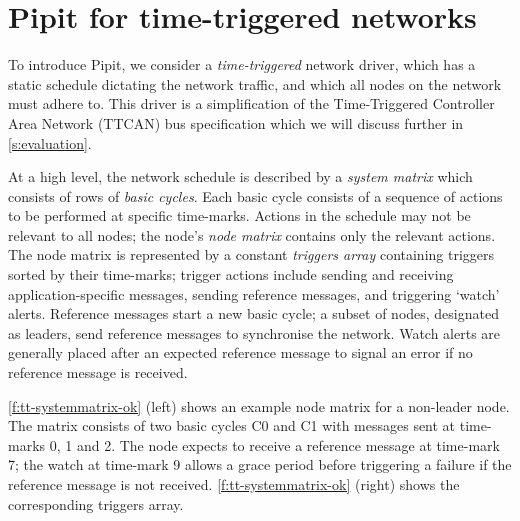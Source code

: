 
\section{Pipit for time-triggered networks}
\label{s:motivation}

To introduce Pipit, we consider a \emph{time-triggered} network driver, which has a static schedule dictating the network traffic, and which all nodes on the network must adhere to.
This driver is a simplification of the Time-Triggered Controller Area Network (TTCAN) bus specification \cite{fuehrer2001time} which we will discuss further in \autoref{s:evaluation}.

At a high level, the network schedule is described by a \emph{system matrix} which consists of rows of \emph{basic cycles}.
Each basic cycle consists of a sequence of actions to be performed at specific time-marks.
Actions in the schedule may not be relevant to all nodes; the node's \emph{node matrix} contains only the relevant actions.
The node matrix is represented by a constant \emph{triggers array} containing triggers sorted by their time-marks; trigger actions include sending and receiving application-specific messages, sending reference messages, and triggering `watch' alerts.
Reference messages start a new basic cycle; a subset of nodes, designated as leaders, send reference messages to synchronise the network.
Watch alerts are generally placed after an expected reference message to signal an error if no reference message is received.

\autoref{f:tt-systemmatrix-ok} (left) shows an example node matrix for a non-leader node.
The matrix consists of two basic cycles C0 and C1 with messages sent at time-marks 0, 1 and 2.
The node expects to receive a reference message at time-mark 7; the watch at time-mark 9 allows a grace period before triggering a failure if the reference message is not received.
\autoref{f:tt-systemmatrix-ok} (right) shows the corresponding triggers array.

